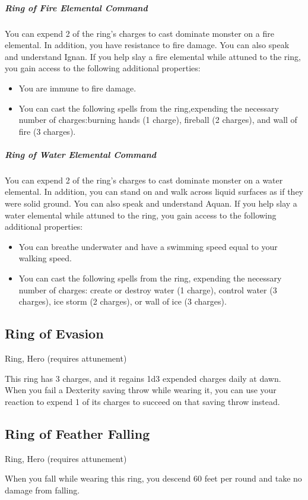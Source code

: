 \subparagraph*{Ring of Fire Elemental Command}
You can expend 2 of the ring's charges to cast dominate monster on a fire elemental. In addition, you have resistance to fire damage. You can also speak and understand Ignan. If you help slay a fire elemental while attuned to the ring, you gain access to the following additional properties:
\begin{itemize}
\item You are immune to fire damage.
\item You can cast the following spells from the ring,expending the necessary number of charges:burning hands (1 charge), fireball (2 charges), and wall of fire (3 charges).
\end{itemize}

\subparagraph*{Ring of Water Elemental Command}
You can expend 2 of the ring's charges to cast dominate monster on a water elemental. In addition, you can stand on and walk across liquid surfaces as if they were solid ground. You can also speak and understand Aquan.  If you help slay a water elemental while attuned to the ring, you gain access to the following additional properties:
\begin{itemize}
\item You can breathe underwater and have a swimming speed equal to your walking speed.
\item You can cast the following spells from the ring, expending the necessary number of charges: create or destroy water (1 charge), control water (3 charges), ice storm (2 charges), or wall of ice (3 charges).
\end{itemize}

\subsection{Ring of Evasion}
Ring, Hero (requires attunement) 

This ring has 3 charges, and it regains 1d3 expended charges daily at dawn. When you fail a Dexterity saving throw while wearing it, you can use your reaction to expend 1 of its charges to succeed on that saving throw instead.

\subsection{Ring of Feather Falling}
Ring, Hero (requires attunement)

When you fall while wearing this ring, you descend 60 feet per round and take no damage from falling.

